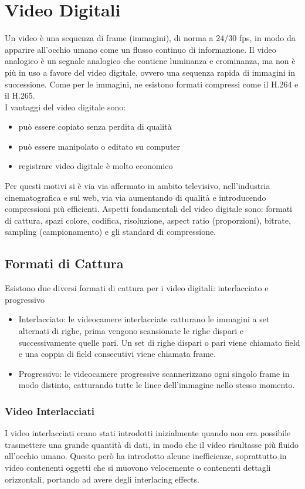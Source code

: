 \documentclass[a4paper,11pt]{article} %
\begin{document}
\newpage
\section{Video Digitali}
Un video è una sequenza di frame (immagini), di norma a $24/30$ fps, in modo da apparire all'occhio umano come un flusso continuo di informazione. Il video analogico è un segnale analogico che contiene luminanza e crominanza, ma non è più in uso a favore del video digitale, ovvero una sequenza rapida di immagini in successione. Come per le immagini, ne esistono formati compressi come il H.264 e il H.265. \\
I vantaggi del video digitale sono: 
\begin{itemize}
\item può essere copiato senza perdita di qualità
\item può essere manipolato o editato su computer
\item registrare video digitale è molto economico
\end{itemize} 
Per questi motivi si è via via affermato in ambito televisivo, nell'industria cinematografica e sul web, via via aumentando di qualità e introducendo compressioni più efficienti. Aspetti fondamentali del video digitale sono: formati di cattura, spazi colore, codifica, risoluzione, aspect ratio (proporzioni), bitrate, sampling (campionamento) e gli standard di compressione.

\subsection{Formati di Cattura}
Esistono due diversi formati di cattura per i video digitali: interlacciato e progressivo
\begin{itemize}
\item Interlacciato: le videocamere interlacciate catturano le immagini a set alternati di righe, prima vengono scansionate le righe dispari e successivamente quelle pari. Un set di righe dispari o pari viene chiamato field e una coppia di field consecutivi viene chiamata frame.
\item Progressivo: le videocamere progressive scannerizzano ogni singolo frame in modo distinto, catturando tutte le linee dell'immagine nello stesso momento.
\end{itemize}

\subsubsection{Video Interlacciati}
I video interlacciati erano stati introdotti inizialmente quando non era possibile trasmettere una grande quantità di dati, in modo che il video risultasse più fluido all'occhio umano. Questo però ha introdotto alcune inefficienze, soprattutto in video contenenti oggetti che si muovono velocemente o contenenti dettagli orizzontali, portando ad avere degli interlacing effects. 
\end{document}
